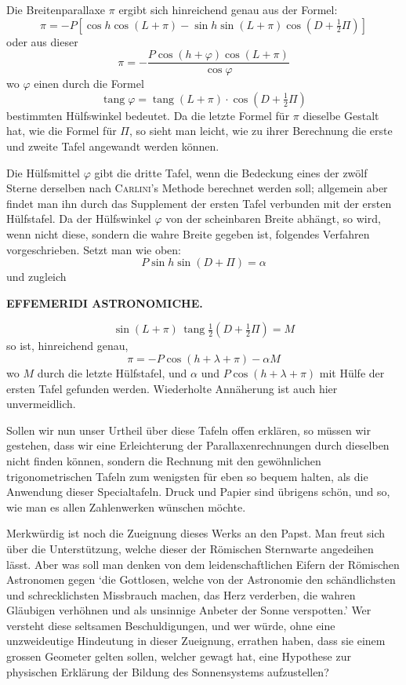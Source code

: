 Die Breitenparallaxe $\pi$ ergibt sich hinreichend genau aus der Formel:
\[
\pi = -P[\cos h \cos(L+\pi) - \sin h \sin(L+\pi)\cos(D+\tfrac{1}{2}\Pi)]
\]
oder aus dieser
\[
\pi = -\dfrac{P\cos(h+\varphi)\cos(L+\pi)}{\cos\varphi}
\]
wo $\varphi$ einen durch die Formel
\[
\operatorname{tang} \varphi = \operatorname{tang}(L+\pi)\cdot\cos(D+\tfrac{1}{2}\Pi)
\]
bestimmten Hülfswinkel bedeutet. Da die letzte Formel für $\pi$ dieselbe Gestalt hat, wie die Formel für
$\Pi$, so sieht man leicht, wie zu ihrer Berechnung die erste und zweite Tafel angewandt werden können.

Die Hülfsmittel $\varphi$ gibt die dritte Tafel, wenn die Bedeckung eines der zwölf Sterne derselben
nach \textsc{Carlini}'s Methode berechnet werden soll; allgemein aber findet man ihn durch das Supplement der
ersten Tafel verbunden mit der ersten Hülfstafel. Da der Hülfswinkel $\varphi$ von der scheinbaren Breite
abhängt, so wird, wenn nicht diese, sondern die wahre Breite gegeben ist, folgendes Verfahren vorgeschrieben. Setzt man wie oben:
\[
P \sin h \sin(D+\Pi) = \alpha
\]
und zugleich\par
\clearpage
\thispagestyle{empty}
\noindent{}%
\makebox[12mm][l]{}%
\parbox[t]{\dimexpr\linewidth-24mm\relax}{\centering\footnotesize\bfseries EFFEMERIDI ASTRONOMICHE.\par}%
\par\medskip
\[
\sin(L+\pi)\,\operatorname{tang}\tfrac{1}{2}(D+\tfrac{1}{2}\Pi) = M
\]
so ist, hinreichend genau,
\[
\pi = -P\cos(h+\lambda+\pi) - \alpha M
\]
wo $M$ durch die letzte Hülfstafel, und $\alpha$ und $P\cos(h+\lambda+\pi)$ mit Hülfe der ersten Tafel gefunden werden. Wiederholte Annäherung ist auch hier unvermeidlich.

Sollen wir nun unser Urtheil über diese Tafeln offen erklären, so müssen wir gestehen, dass wir eine Erleichterung der Parallaxenrechnungen durch dieselben nicht finden können, sondern die Rechnung mit den gewöhnlichen trigonometrischen Tafeln zum wenigsten für eben so bequem halten, als die Anwendung dieser Specialtafeln. Druck und Papier sind übrigens schön, und so, wie man es allen Zahlenwerken wünschen möchte.

Merkwürdig ist noch die Zueignung dieses Werks an den Papst. Man freut sich über die Unterstützung, welche dieser der Römischen Sternwarte angedeihen lässt. Aber was soll man denken von dem leidenschaftlichen Eifern der Römischen Astronomen gegen `die Gottlosen, welche von der Astronomie den schändlichsten und schrecklichsten Missbrauch machen, das Herz verderben, die wahren Gläubigen verhöhnen und als unsinnige Anbeter der Sonne verspotten.' Wer versteht diese seltsamen Beschuldigungen, und wer würde, ohne eine unzweideutige Hindeutung in dieser Zueignung, errathen haben, dass sie einem grossen Geometer gelten sollen, welcher gewagt hat, eine Hypothese zur physischen Erklärung der Bildung des Sonnensystems aufzustellen?
